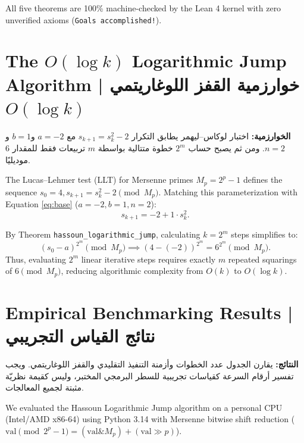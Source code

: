\documentclass[11pt,a4paper]{article}
\theoremstyle{definition}
\begin{document}
All five theorems are 100\% machine-checked by the Lean 4 kernel with zero unverified axioms (\texttt{Goals accomplished!}).

\section{The $O(\log k)$ Logarithmic Jump Algorithm | خوارزمية القفز اللوغاريتمي $O(\log k)$}

\begin{Arabic}
\begin{flushright}
\textbf{الخوارزمية:} اختبار لوكاس--ليهمر يطابق التكرار $s_{k+1}=s_k^2-2$ مع $a=-2$ و$b=1$ و$n=2$. ومن ثم يصبح حساب $2^m$ خطوة متتالية بواسطة $m$ تربيعات فقط للمقدار $6$ موديليًا.
\end{flushright}
\end{Arabic}

The Lucas--Lehmer test (LLT) for Mersenne primes $M_p = 2^p - 1$ defines the sequence $s_0 = 4, s_{k+1} = s_k^2 - 2 \pmod{M_p}$. Matching this parameterization with Equation \eqref{eq:base} ($a = -2, b = 1, n = 2$):
\begin{equation}
s_{k+1} = -2 + 1 \cdot s_k^2.
\end{equation}

By Theorem \texttt{hassoun\_logarithmic\_jump}, calculating $k = 2^m$ steps simplifies to:
\begin{equation}
(s_0 - a)^{2^m} \pmod{M_p} \implies (4 - (-2))^{2^m} = 6^{2^m} \pmod{M_p}.
\end{equation}
Thus, evaluating $2^m$ linear iterative steps requires exactly $m$ repeated squarings of $6 \pmod{M_p}$, reducing algorithmic complexity from $O(k)$ to $O(\log k)$.

\section{Empirical Benchmarking Results | نتائج القياس التجريبي}

\begin{Arabic}
\begin{flushright}
\textbf{النتائج:} يقارن الجدول عدد الخطوات وأزمنة التنفيذ التقليدي والقفز اللوغاريتمي. ويجب تفسير أرقام السرعة كقياسات تجريبية للسطر البرمجي المختبر، وليس كقيمة نظريّة مثبتة لجميع المعالجات.
\end{flushright}
\end{Arabic}

We evaluated the Hassoun Logarithmic Jump algorithm on a personal CPU (Intel/AMD x86-64) using Python 3.14 with Mersenne bitwise shift reduction ($\text{val} \pmod{2^p-1} = (\text{val} \mathbin{\&} M_p) + (\text{val} \gg p)$).
\end{document}
